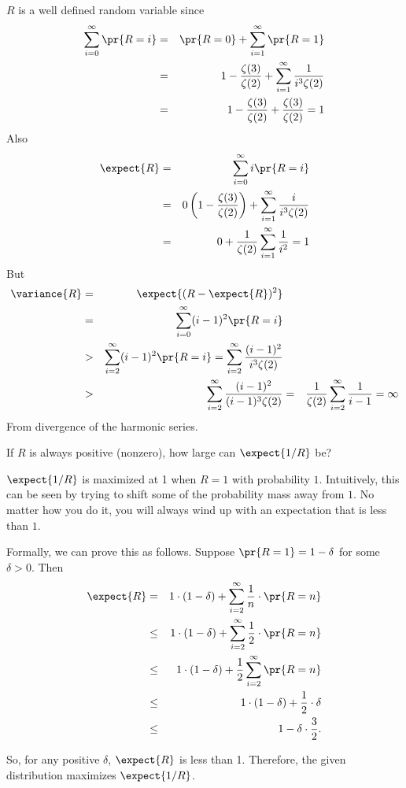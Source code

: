 \begin{problem}
\begin{problemparts}
\begin{solution}
$R$ is a well defined random variable since
\begin{eqnarray*}
\sum_{i=0}^\infty\pr{R=i}&=&\pr{R=0}+\sum_{i=1}^\infty\pr{R=1}\\
&=&1-\frac{\zeta(3)}{\zeta(2)}+\sum_{i=1}^\infty\frac{1}{i^3\zeta(2)}\\
&=&1-\frac{\zeta(3)}{\zeta(2)}+\frac{\zeta(3)}{\zeta(2)}=1
\end{eqnarray*}
Also
\begin{eqnarray*}
\expect{R}&=&\sum_{i=0}^\infty i\pr{R=i}\\
&=&0\left(1-\frac{\zeta(3)}{\zeta(2)}\right)+\sum_{i=1}^\infty\frac{i}{i^3\zeta(2)}\\
&=&0+\frac{1}{\zeta(2)}\sum_{i=1}^\infty\frac{1}{i^2}=1
\end{eqnarray*}
But
\begin{eqnarray*}
\variance{R}
&=& \expect{(R-\expect{R})^2}\\
&=& \sum_{i=0}^\infty (i-1)^2\pr{R=i}\\
&>& \sum_{i=2}^\infty (i-1)^2\pr{R=i}=\sum_{i=2}^\infty \frac{(i-1)^2}{i^3\zeta(2)}\\
&>& \sum_{i=2}^\infty\frac{(i-1)^2}{(i-1)^3\zeta(2)}
&=& \frac{1}{\zeta(2)}\sum_{i=2}^\infty\frac{1}{i-1} = \infty
\end{eqnarray*}
From divergence of the harmonic series.

\end{solution}

\problempart
If $R$ is always positive (nonzero), how large can $\expect{1/R}$ be?

\begin{solution}

$\expect{1/R}$ is maximized at 1 when $R = 1$ with probability $1$.
Intuitively, this can be seen by trying to shift some of the
probability mass away from $1$.  No matter how you do it, you will
always wind up with an expectation that is less than $1$.

Formally, we can prove this as follows. Suppose $\pr{R=1} = 1-\delta$
for some $\delta > 0$. Then
\begin{eqnarray*}
\expect{R}
& = & 1\cdot(1-\delta) + \sum_{i=2}^{\infty}\frac{1}{n}\cdot \pr{R=n}\\
& \leq & 1\cdot(1-\delta) + \sum_{i=2}^{\infty}\frac{1}{2}\cdot \pr{R=n}\\
& \leq & 1\cdot(1-\delta) + \frac{1}{2}\sum_{i=2}^{\infty}\pr{R=n}\\
& \leq & 1\cdot(1-\delta) + \frac{1}{2}\cdot\delta\\
& \leq & 1-\delta\cdot\frac{3}{2}.\\
\end{eqnarray*}

So, for any positive $\delta$, $\expect{R}$ is less than 1.
Therefore, the given distribution maximizes $\expect{1/R}$.
\end{solution}

\end{problemparts}
\end{problem}

